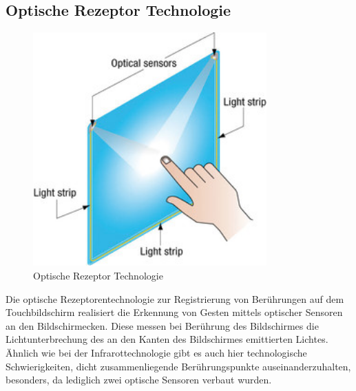 \documentclass[12pt,oneside,a4paper,bibtotoc,liststotoc]{scrreprt}
\begin{document}
\subsection{Optische Rezeptor Technologie}
\begin{figure}[H]
  \begin{centering}
    \includegraphics[width=0.8\textwidth]{img/optical_receptor.jpg}
    \caption{Optische Rezeptor Technologie \cite[vgl. Optisch]{002}}
    \label{optical_receptor}
  \end{centering}
\end{figure}
Die optische Rezeptorentechnologie zur Registrierung von Berührungen auf dem Touchbildschirm realisiert die Erkennung von Gesten mittels optischer Sensoren an den Bildschirmecken. Diese messen bei Berührung des Bildschirmes die Lichtunterbrechung des an den Kanten des Bildschirmes emittierten Lichtes. Ähnlich wie bei der Infrarottechnologie gibt es auch hier technologische Schwierigkeiten, dicht zusammenliegende Berührungspunkte auseinanderzuhalten, besonders, da lediglich zwei optische Sensoren verbaut wurden.
\end{document}
